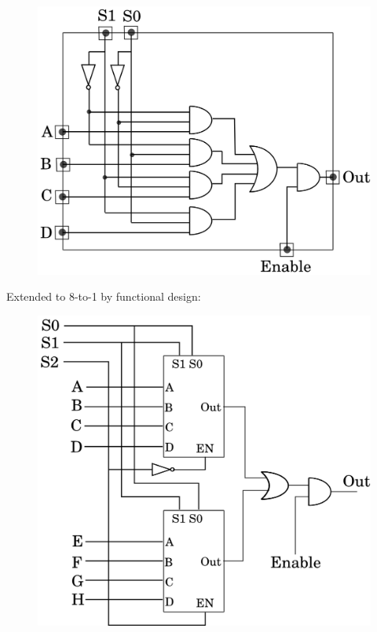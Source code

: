 \documentclass[twocolumn,english]{article}
\begin{document}
\begin{figure}[H]
\noindent \centering{}\includegraphics[width=0.15\paperwidth]{img/mx4}
\end{figure}


Extended to 8-to-1 by functional design:

\begin{figure}[H]
\noindent \centering{}\includegraphics[width=0.2\paperwidth]{img/mx8}
\end{figure}
\end{document}
